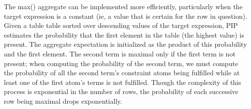 The max() aggregate can be implemented more efficiently, particularly when the target expression is a constant (ie, a value that is certain for the row in question).  Given a table table sorted over descending values of the target expression, PIP estimates the probability that the first element in the table (the highest value) is present.  The aggregate expectation is initialized as the product of this probability and the first element.  The second term is maximal only if the first term is not present; when computing the probability of the second term, we must compute the probability of all the second term's constraint atoms being fulfilled while at least one of the first atom's terms is not fulfilled.  Though the complexity of this process is exponential in the number of rows, the probability of each successive row being maximal drops exponentially.  

